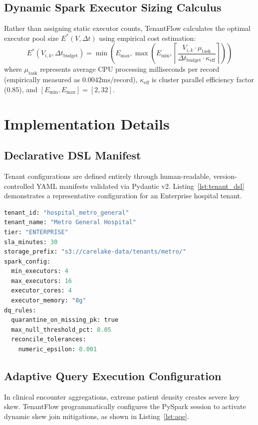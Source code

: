 \documentclass[10pt,journal,compsoc]{IEEEtran}
\begin{document}
\subsection{Dynamic Spark Executor Sizing Calculus}
Rather than assigning static executor counts, TenantFlow calculates the optimal executor pool size $E^*(V, \Delta t)$ using empirical cost estimation:
\begin{equation}
E^*(V_{i,k}, \Delta t_{\text{budget}}) = \min\left(E_{\max}, \max\left(E_{\min}, \left\lceil \frac{V_{i,k} \cdot \mu_{\text{task}}}{\Delta t_{\text{budget}} \cdot \kappa_{\text{eff}}} \right\rceil\right)\right)
\end{equation}
where $\mu_{\text{task}}$ represents average CPU processing milliseconds per record (empirically measured as $0.0042\text{ms/record}$), $\kappa_{\text{eff}}$ is cluster parallel efficiency factor ($0.85$), and $[E_{\min}, E_{\max}] = [2, 32]$.

\section{Implementation Details}
\subsection{Declarative DSL Manifest}
Tenant configurations are defined entirely through human-readable, version-controlled YAML manifests validated via Pydantic v2. Listing~\ref{lst:tenant_dsl} demonstrates a representative configuration for an Enterprise hospital tenant.

\begin{lstlisting}[language=Python, caption={TenantFlow Declarative YAML Manifest.}, label={lst:tenant_dsl}]
tenant_id: "hospital_metro_general"
tenant_name: "Metro General Hospital"
tier: "ENTERPRISE"
sla_minutes: 30
storage_prefix: "s3://carelake-data/tenants/metro/"
spark_config:
  min_executors: 4
  max_executors: 16
  executor_cores: 4
  executor_memory: "8g"
dq_rules:
  quarantine_on_missing_pk: true
  max_null_threshold_pct: 0.05
  reconcile_tolerances:
    numeric_epsilon: 0.001
\end{lstlisting}

\subsection{Adaptive Query Execution Configuration}
In clinical encounter aggregations, extreme patient density creates severe key skew. TenantFlow programmatically configures the PySpark session to activate dynamic skew join mitigations, as shown in Listing~\ref{lst:aqe}.
\end{document}
